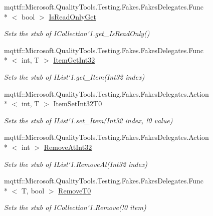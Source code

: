 \begin{DoxyCompactItemize}
mqttf\-::\-Microsoft.\-Quality\-Tools.\-Testing.\-Fakes.\-Fakes\-Delegates.\-Func\\*
$<$ bool $>$ \hyperlink{class_system_1_1_collections_1_1_generic_1_1_fakes_1_1_stub_i_list_3_01_t_01_4_a0eb0fdcd5e06c75b6606254df75a637b}{Is\-Read\-Only\-Get}
\begin{DoxyCompactList}\small\item\em Sets the stub of I\-Collection`1.get\-\_\-\-Is\-Read\-Only()\end{DoxyCompactList}\item 
mqttf\-::\-Microsoft.\-Quality\-Tools.\-Testing.\-Fakes.\-Fakes\-Delegates.\-Func\\*
$<$ int, T $>$ \hyperlink{class_system_1_1_collections_1_1_generic_1_1_fakes_1_1_stub_i_list_3_01_t_01_4_aea8a67d7e88c7b260c897cda32e6eff8}{Item\-Get\-Int32}
\begin{DoxyCompactList}\small\item\em Sets the stub of I\-List`1.get\-\_\-\-Item(\-Int32 index)\end{DoxyCompactList}\item 
mqttf\-::\-Microsoft.\-Quality\-Tools.\-Testing.\-Fakes.\-Fakes\-Delegates.\-Action\\*
$<$ int, T $>$ \hyperlink{class_system_1_1_collections_1_1_generic_1_1_fakes_1_1_stub_i_list_3_01_t_01_4_ab1abce653fcffbf693f457418b43b2c7}{Item\-Set\-Int32\-T0}
\begin{DoxyCompactList}\small\item\em Sets the stub of I\-List`1.set\-\_\-\-Item(Int32 index, !0 value)\end{DoxyCompactList}\item 
mqttf\-::\-Microsoft.\-Quality\-Tools.\-Testing.\-Fakes.\-Fakes\-Delegates.\-Action\\*
$<$ int $>$ \hyperlink{class_system_1_1_collections_1_1_generic_1_1_fakes_1_1_stub_i_list_3_01_t_01_4_a5c3c8959720f46fe11da7c0afd7b0fdb}{Remove\-At\-Int32}
\begin{DoxyCompactList}\small\item\em Sets the stub of I\-List`1.Remove\-At(\-Int32 index)\end{DoxyCompactList}\item 
mqttf\-::\-Microsoft.\-Quality\-Tools.\-Testing.\-Fakes.\-Fakes\-Delegates.\-Func\\*
$<$ T, bool $>$ \hyperlink{class_system_1_1_collections_1_1_generic_1_1_fakes_1_1_stub_i_list_3_01_t_01_4_a3a5efe199b0d918876348813fa0832cd}{Remove\-T0}
\begin{DoxyCompactList}\small\item\em Sets the stub of I\-Collection`1.Remove(!0 item)\end{DoxyCompactList}\end{DoxyCompactItemize}


